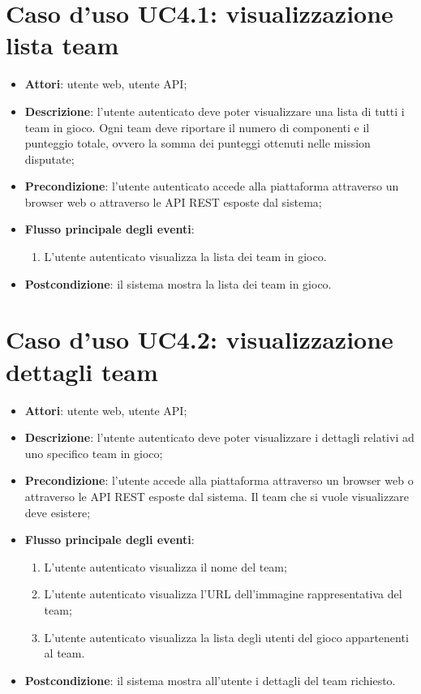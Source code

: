 \section{Caso d'uso UC4.1: visualizzazione lista team}
\begin{itemize}
\item \textbf{Attori}: utente web, utente API;
\item \textbf{Descrizione}: l'utente autenticato deve poter visualizzare una lista di tutti i team in gioco. Ogni team deve riportare il numero di componenti e il punteggio totale, ovvero la somma dei punteggi ottenuti nelle mission disputate; 
      \item \textbf{Precondizione}: l'utente autenticato accede alla piattaforma attraverso un browser web o attraverso le API REST esposte dal sistema;

        \item \textbf{Flusso principale degli eventi}:
          \begin{enumerate}
          \item L'utente autenticato visualizza la lista dei team in gioco.

      \end{enumerate}
    \item \textbf{Postcondizione}: il sistema mostra la lista dei team in gioco.
  \end{itemize}
\hypertarget{UC4.2}{}
\section{Caso d'uso UC4.2: visualizzazione dettagli team}
\begin{itemize}
\item \textbf{Attori}: utente web, utente API;
\item \textbf{Descrizione}: l'utente autenticato deve poter visualizzare i dettagli relativi ad uno specifico team in gioco; 
      \item \textbf{Precondizione}: l'utente accede alla piattaforma attraverso un browser web o attraverso le API REST esposte dal sistema. Il team che si vuole visualizzare deve esistere;

        \item \textbf{Flusso principale degli eventi}:
          \begin{enumerate}
          \item L'utente autenticato visualizza il nome del team;
          \item L'utente autenticato visualizza l'URL dell'immagine rappresentativa del team;
          \item L'utente autenticato visualizza la lista degli utenti del gioco appartenenti al team.

      \end{enumerate}
    \item \textbf{Postcondizione}: il sistema mostra all'utente i dettagli del team richiesto.
  \end{itemize}
\hypertarget{UC4.3}{}
